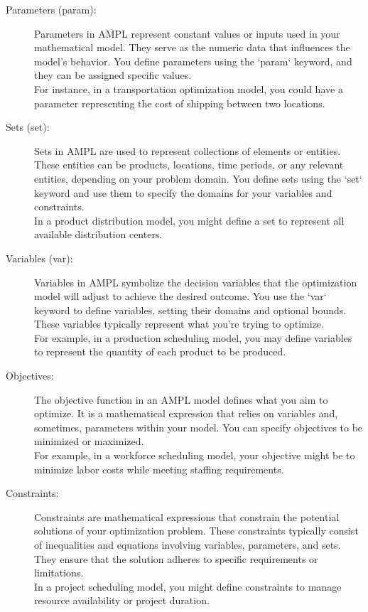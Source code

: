 \begin{description}
    \item[Parameters (param):] 
    Parameters in AMPL represent constant values or inputs used in your mathematical model. They serve as the numeric data that influences the model's behavior. You define parameters using the `param` keyword, and they can be assigned specific values. \\
    For instance, in a transportation optimization model, you could have a parameter representing the cost of shipping between two locations.\\
    \item[Sets (set):]
    Sets in AMPL are used to represent collections of elements or entities. These entities can be products, locations, time periods, or any relevant entities, depending on your problem domain. You define sets using the `set` keyword and use them to specify the domains for your variables and constraints. \\
    In a product distribution model, you might define a set to represent all available distribution centers.\\
    
\item[Variables (var):]
    Variables in AMPL symbolize the decision variables that the optimization model will adjust to achieve the desired outcome. You use the `var` keyword to define variables, setting their domains and optional bounds. These variables typically represent what you're trying to optimize. \\
    For example, in a production scheduling model, you may define variables to represent the quantity of each product to be produced.\\
    
\item[Objectives:]
    The objective function in an AMPL model defines what you aim to optimize. It is a mathematical expression that relies on variables and, sometimes, parameters within your model. You can specify objectives to be minimized or maximized. \\
    For example, in a workforce scheduling model, your objective might be to minimize labor costs while meeting staffing requirements.\\

\item[Constraints:]
    Constraints are mathematical expressions that constrain the potential solutions of your optimization problem. These constraints typically consist of inequalities and equations involving variables, parameters, and sets. They ensure that the solution adheres to specific requirements or limitations. \\
    In a project scheduling model, you might define constraints to manage resource availability or project duration.
\end{description}

